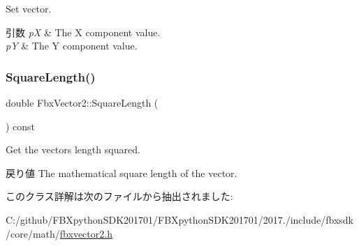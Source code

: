 Set vector. 
\begin{DoxyParams}{引数}
{\em pX} & The X component value. \\
\hline
{\em pY} & The Y component value. \\
\hline
\end{DoxyParams}
\mbox{\label{class_fbx_vector2_ab0ca231fe7ccb6eb044c9e48f105cbcf}} 
\subsubsection{\texorpdfstring{Square\+Length()}{SquareLength()}}
{\footnotesize\ttfamily double Fbx\+Vector2\+::\+Square\+Length (\begin{DoxyParamCaption}{ }\end{DoxyParamCaption}) const}

Get the vector\textquotesingle{}s length squared. \begin{DoxyReturn}{戻り値}
The mathematical square length of the vector. 
\end{DoxyReturn}


このクラス詳解は次のファイルから抽出されました\+:\begin{DoxyCompactItemize}
\item 
C\+:/github/\+F\+B\+Xpython\+S\+D\+K201701/\+F\+B\+Xpython\+S\+D\+K201701/2017./include/fbxsdk/core/math/\hyperlink{fbxvector2_8h}{fbxvector2.\+h}\end{DoxyCompactItemize}
